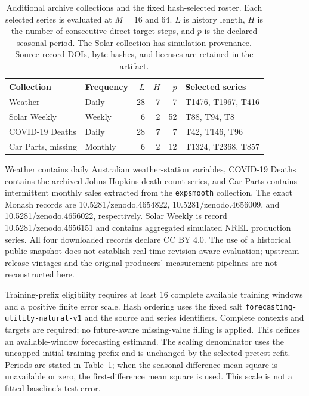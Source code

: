 \begin{table}[ht]
\centering\small\setlength{\tabcolsep}{4pt}
\caption{Additional archive collections and the fixed hash-selected roster.
Each selected series is evaluated at $M=16$ and $64$. $L$ is history
length, $H$ is the number of consecutive direct target steps, and $p$ is
the declared seasonal period. The Solar collection has simulation
provenance. Source record DOIs, byte hashes, and licenses are retained in
the artifact.}
\label{tab:utility-roster}
\begin{tabular}{llrrrl}
\toprule
Collection & Frequency & $L$ & $H$ & $p$ & Selected series \\
\midrule
Weather & Daily & 28 & 7 & 7 & T1476, T1967, T416 \\
Solar Weekly & Weekly & 6 & 2 & 52 & T88, T94, T8 \\
COVID-19 Deaths & Daily & 28 & 7 & 7 & T42, T146, T96 \\
Car Parts, missing & Monthly & 6 & 2 & 12 & T1324, T2368, T857 \\
\bottomrule
\end{tabular}
\end{table}

Weather contains daily Australian weather-station variables, COVID-19
Deaths contains the archived Johns Hopkins death-count series, and Car
Parts contains intermittent monthly sales extracted from the
\texttt{expsmooth} collection. The exact Monash records are
10.5281/zenodo.4654822, 10.5281/zenodo.4656009, and
10.5281/zenodo.4656022, respectively. Solar Weekly is record
10.5281/zenodo.4656151 and contains aggregated simulated NREL production
series. All four downloaded records declare CC BY 4.0. The use of a
historical public snapshot does not establish real-time revision-aware
evaluation; upstream release vintages and the original producers'
measurement pipelines are not reconstructed here.

Training-prefix eligibility requires at least 16 complete available
training windows and a positive finite error scale. Hash ordering uses
the fixed salt \texttt{forecasting-utility-natural-v1} and the source and
series identifiers. Complete contexts and targets are required; no
future-aware missing-value filling is applied. This defines an
available-window forecasting estimand. The scaling denominator uses the
uncapped initial training prefix and is unchanged by the selected
pretest refit. Periods are stated in Table~\ref{tab:utility-roster}; when
the seasonal-difference mean square is unavailable or zero, the
first-difference mean square is used. This scale is not a fitted
baseline's test error.

